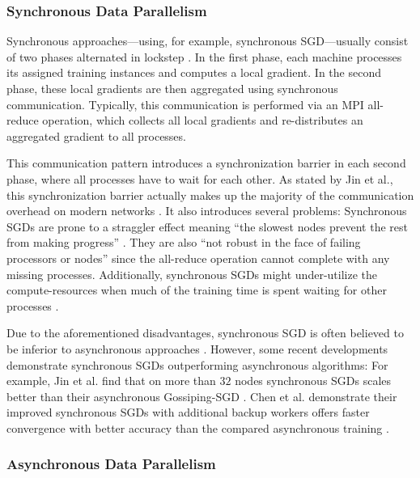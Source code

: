 \documentclass[conference,compsoc,a4paper]{IEEEtran}
\begin{document}
\subsubsection{Synchronous Data Parallelism} %
\label{ssub:synchronous_data_parallelism}
Synchronous approaches---using, for example, synchronous SGD---usually consist of two phases alternated in lockstep \cite{jin2016-How-to-scale}.
In the first phase, each machine processes its assigned training instances and computes a local gradient.
In the second phase, these local gradients are then aggregated using synchronous communication.
Typically, this communication is performed via an MPI all-reduce operation, which collects all local gradients and re-distributes an aggregated gradient to all processes.

This communication pattern introduces a synchronization barrier in each second phase, where all processes have to wait for each other.
As stated by Jin et al., this synchronization barrier actually makes up the majority of the communication overhead on modern networks \cite{jin2016-How-to-scale}.
It also introduces several problems:
Synchronous SGDs are prone to a straggler effect meaning ``the slowest nodes prevent the rest from making progress'' \cite{jin2016-How-to-scale}.
They are also ``not robust in the face of failing processors or nodes'' \cite{jin2016-How-to-scale} since the all-reduce operation cannot complete with any missing processes.
Additionally, synchronous SGDs might under-utilize the compute-resources when much of the training time is spent waiting for other processes \cite{jin2016-How-to-scale}.

Due to the aforementioned disadvantages, synchronous SGD is often believed to be inferior to asynchronous approaches \cite{chen2016-Revisiting-distributed-synchronous-SGD}.
However, some recent developments demonstrate synchronous SGDs outperforming asynchronous algorithms:
For example, Jin et al. find that on more than $32$ nodes synchronous SGDs scales better than their asynchronous Gossiping-SGD \cite{jin2016-How-to-scale}.
Chen et al. demonstrate their improved synchronous SGDs with additional backup workers offers faster convergence with better accuracy than the compared asynchronous training \cite{chen2016-Revisiting-distributed-synchronous-SGD}.


\subsubsection{Asynchronous Data Parallelism} %
\label{ssub:asynchronous_data_parallelism}
\end{document}
